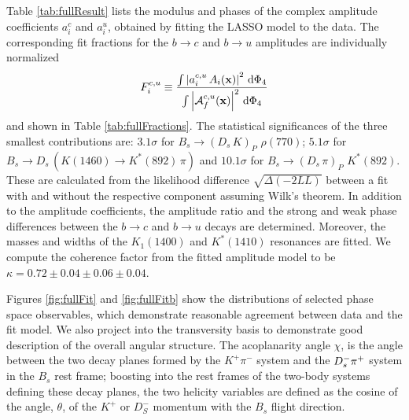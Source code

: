 Table \ref{tab:fullResult} 
lists the modulus and phases of the complex amplitude coefficients $a^c_{i}$ and $a^u_{i}$, 
obtained by fitting the LASSO model to the data.
The corresponding fit fractions for the $b\to c$ and $b\to u$ amplitudes are individually normalized
\begin{equation}
\label{eq:DefineFitFractions}
	F^{c,u}_{i} \equiv \frac{\int \left\vert   a_{i}^{c,u} \, A_{i}(\mathbf{x}) \right\vert^{2} \, \text{d}\Phi_{4} }
	{\int \left\vert  \mathcal A_f^{c,u}(\mathbf{x}) \right\vert^{2} \, \text{d}\Phi_{4}}  
\end{equation}
and shown in Table \ref{tab:fullFractions}.
The statistical significances
 of the three smallest contributions are:
 $3.1\sigma$ for $B_s \to ( D_s \, K)_{P} \, \, \rho(770)$;
 $5.1\sigma$ for $B_s \to D_s \, ( K(1460) \to K^{*}(892) \, \pi )$
 and $10.1\sigma$
for $B_s \to ( D_s \, \pi)_{P} \, \, K^{*}(892)$.
These are calculated from the likelihood difference $\sqrt{\Delta(-2LL)}$ between a fit with and without the respective component assuming Wilk's theorem.
In addition to the amplitude coefficients, the amplitude ratio and the strong and weak phase differences between the $b\to c$ and $b\to u$ decays are determined.
Moreover, the masses and widths of the $K_1(1400)$ and $K^{*}(1410)$ resonances are fitted.
We compute the coherence factor from the fitted amplitude model to be
$\kappa = 0.72 \pm 0.04 \pm 0.06 \pm 0.04$.

Figures \ref{fig:fullFit} and \ref{fig:fullFitb}  show the distributions of 
selected phase space observables, which demonstrate 
reasonable agreement between data and the fit model. 
We also project into the transversity basis to demonstrate good description of the overall angular structure.
The acoplanarity angle 
${\chi}$, is the angle between the two decay planes formed by 
the $K^+\pi^-$ system and the $D_s^- {{\pi}^+}$ system
in the $B_s$ rest frame; boosting into the rest frames of the two-body systems defining these decay planes,
the two helicity variables 
are defined as the cosine of the angle, ${\theta}$, 
of the $K^+$ or $D_S^-$ momentum with the $B_s$ flight direction.


